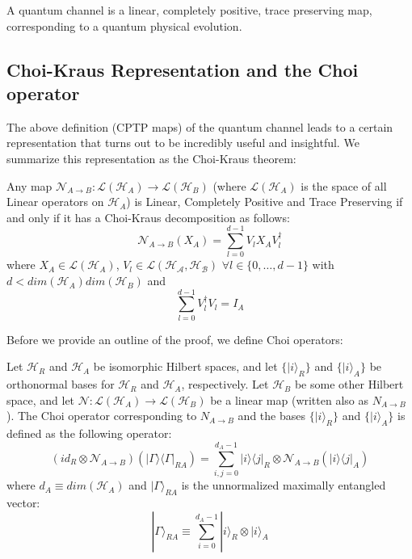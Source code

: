 \begin{definition}
    A quantum channel is a linear, completely positive, trace preserving map, corresponding to a quantum physical evolution.
\end{definition}

\subsection{Choi-Kraus Representation and the Choi operator}

The above definition (CPTP maps) of the quantum channel leads to a certain representation that turns
out to be incredibly useful and insightful. We summarize this representation as the Choi-Kraus theorem:
\begin{theorem}
    Any map $\mathcal{N}_{A\rightarrow B}:\mathcal{L}(\mathcal{H}_A) \rightarrow \mathcal{L}(\mathcal{H}_B)$
    (where $\mathcal{L}(\mathcal{H}_A)$ is the space of all Linear operators on $\mathcal{H}_A$) is Linear,
    Completely Positive and Trace Preserving if and only if it has a Choi-Kraus decomposition as follows:
    \begin{equation*}
        \mathcal{N}_{A \rightarrow B}(X_A) = \displaystyle\sum_{l=0}^{d-1} V_l X_A V_l^\dagger
    \end{equation*}
    where $X_A \in \mathcal{L}(\mathcal{H}_A)$, $V_l \in \mathcal{L}(\mathcal{H_A}, \mathcal{H_B})$ 
    $\forall l \in \{0,\dots,d-1\}$ with $d < dim(\mathcal{H}_A)dim(\mathcal{H}_B)$ and
    \begin{equation*}
        \displaystyle\sum_{l=0}^{d-1} V_l^\dagger V_l = I_A
    \end{equation*}
\end{theorem}

Before we provide an outline of the proof, we define Choi operators:

\begin{definition}
    Let $\mathcal{H}_R$ and $\mathcal{H}_A$ be isomorphic Hilbert spaces, and let
    $\{| i\rangle_R \}$ and $\{|i\rangle_A \}$ be orthonormal bases for $\mathcal{H}_R$
    and $\mathcal{H}_A$, respectively. Let $\mathcal{H}_B$ be some other Hilbert space,
    and let $\mathcal{N} : \mathcal{L}(\mathcal{H}_A) \rightarrow \mathcal{L}(\mathcal{H}_B)$
    be a linear map (written also as $N_{A\rightarrow B}$). The Choi operator corresponding
    to $N_{A\rightarrow B}$ and the bases $\{| i\rangle_R \}$ and $\{|i\rangle_A \}$ is defined
    as the following operator:
    \begin{equation*}
        (id_R \otimes \mathcal{N}_{A \rightarrow B})(| \Gamma \rangle\langle \Gamma |_{RA})
        = \displaystyle\sum_{i,j = 0}^{d_A-1}| i \rangle\langle j |_R \otimes \mathcal{N}_{A \rightarrow B}(| i \rangle\langle j |_A)
    \end{equation*}
    where $d_A \equiv dim(\mathcal{H}_A)$ and $| \Gamma \rangle_{RA}$ is the unnormalized maximally entangled vector:
    \begin{equation*}
        | \Gamma \rangle_{RA} \equiv \displaystyle\sum_{i=0}^{d_A - 1} | i \rangle_R \otimes | i \rangle_A
    \end{equation*}
\end{definition}

